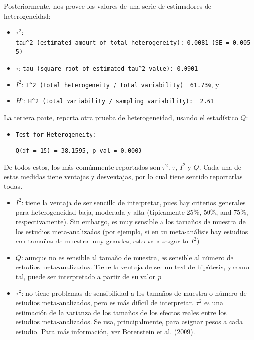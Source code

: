 \documentclass[
  bookmarksnumbered]{article}
\begin{document}
Posteriormente, nos provee los valores de una serie de estimadores de heterogeneidad:

\begin{itemize}
\item
  \(\tau^2\): \texttt{tau\^{}2\ (estimated\ amount\ of\ total\ heterogeneity):\ 0.0081\ (SE\ =\ 0.0055)}
\item
  \(\tau\): \texttt{tau\ (square\ root\ of\ estimated\ tau\^{}2\ value):\ 0.0901}
\item
  \(I^2\): \texttt{I\^{}2\ (total\ heterogeneity\ /\ total\ variability):\ 61.73\%}, y
\item
  \(H^2\): \texttt{H\^{}2\ (total\ variability\ /\ sampling\ variability):\ \ 2.61}
\end{itemize}

La tercera parte, reporta otra prueba de heterogeneidad, usando el estadístico \(Q\):

\begin{itemize}
\item
  \texttt{Test\ for\ Heterogeneity:}

  \texttt{Q(df\ =\ 15)\ =\ 38.1595,\ p-val\ =\ 0.0009}
\end{itemize}

De todos estos, los más comúnmente reportados son \(\tau^2\), \(\tau\), \(I^2\) y \(Q\). Cada una de estas medidas tiene ventajas y desventajas, por lo cual tiene sentido reportarlas todas.

\begin{itemize}
\item
  \(I^2\): tiene la ventaja de ser sencillo de interpretar, pues hay criterios generales para heterogeneidad baja, moderada y alta (típicamente 25\%, 50\%, and 75\%, respectivamente). Sin embargo, es muy sensible a los tamaños de muestra de los estudios meta-analizados (por ejemplo, si en tu meta-análisis hay estudios con tamaños de muestra muy grandes, esto va a sesgar tu \(I^2\)).
\item
  \(Q\): aunque no es sensible al tamaño de muestra, es sensible al número de estudios meta-analizados. Tiene la ventaja de ser un test de hipótesis, y como tal, puede ser interpretado a partir de su valor \emph{p}.
\item
  \(\tau^2\): no tiene problemas de sensibilidad a los tamaños de muestra o número de estudios meta-analizados, pero es más difícil de interpretar. \(\tau^2\) es una estimación de la varianza de los tamaños de los efectos reales entre los estudios meta-analizados. Se usa, principalmente, para asignar pesos a cada estudio. Para más información, ver Borenstein et al. (\protect\hyperlink{ref-borensteinIdentifyingQuantifyingHeterogeneity2009}{2009}).
\end{itemize}
\end{document}
